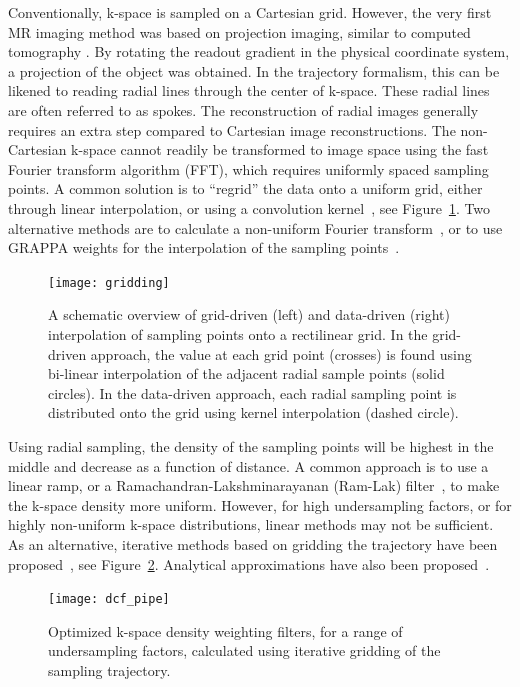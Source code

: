 Conventionally, k-space is sampled on a Cartesian grid. However, the very first MR imaging method was based on projection imaging, similar to computed tomography \cite{Lauterbur1973}. By rotating the readout gradient in the physical coordinate system, a projection of the object was obtained. In the trajectory formalism, this can be likened to reading radial lines through the center of k-space. These radial lines are often referred to as spokes. The reconstruction of radial images generally requires an extra step compared to Cartesian image reconstructions. The non-Cartesian k-space cannot readily be transformed to image space using the fast Fourier transform algorithm (FFT),  which requires uniformly spaced sampling points. A common solution is to ``regrid'' the data onto a uniform grid, either through linear interpolation, or using a convolution kernel~\cite{Jackson1991}, see Figure~\ref{fig:gridding}. Two alternative methods are to calculate a non-uniform Fourier transform~\cite{Sarty2001}, or to use GRAPPA weights for the interpolation of the sampling points~\cite{Seiberlich2007}.
\begin{figure}[htbp]
    \centering
    \texttt{[image: gridding]}
\caption{A schematic overview of grid-driven (left) and data-driven (right) interpolation of sampling points onto a rectilinear grid. In the grid-driven approach, the value at each grid point (crosses) is found using bi-linear interpolation of the adjacent radial sample points (solid circles). In the data-driven approach, each radial sampling point is distributed onto the grid using kernel interpolation (dashed circle).}
    \label{fig:gridding}
\end{figure}
Using radial sampling, the density of the sampling points will be highest in the middle and decrease as a function of distance. A common approach is to use a linear ramp, or a Ramachandran-Lakshminarayanan (Ram-Lak) filter~\cite{Ramachandran1971}, to make the k-space density more uniform. However, for high undersampling factors, or for highly non-uniform k-space distributions, linear methods may not be sufficient. As an alternative, iterative methods based on gridding the trajectory have been proposed~\cite{Pipe1999}, see Figure~\ref{fig:pipe}. Analytical approximations have also been proposed~\cite{Nielles-Vallespin2007}. 
\begin{figure}
    \centering
    \texttt{[image: dcf\_pipe]}
\caption{Optimized k-space density weighting filters, for a range of undersampling factors, calculated using iterative gridding of the sampling trajectory.}
    \label{fig:pipe}
\end{figure}

